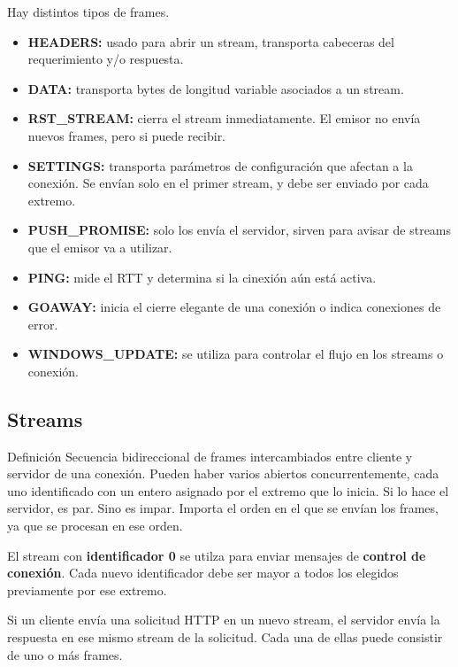 Hay distintos tipos de frames.

\begin{itemize}[label=\textcolor{acento}{$\bullet$}]
    \item \textbf{HEADERS:} usado para abrir un stream, transporta cabeceras del requerimiento y/o respuesta.
    \item \textbf{DATA:} transporta bytes de longitud variable asociados a un stream.
    \item \textbf{RST\_STREAM:} cierra el stream inmediatamente. El emisor no envía nuevos frames, pero si puede recibir.
    \item \textbf{SETTINGS:} transporta parámetros de configuración que afectan a la conexión. Se envían solo en el primer stream, y debe ser enviado por cada extremo.
    \item \textbf{PUSH\_PROMISE:} solo los envía el servidor, sirven para avisar de streams que el emisor va a utilizar.
    \item \textbf{PING:} mide el RTT y determina si la cinexión aún está activa.
    \item \textbf{GOAWAY:} inicia el cierre elegante de una conexión o indica conexiones de error.
    \item \textbf{WINDOWS\_UPDATE:} se utiliza para controlar el flujo en los streams o conexión.
\end{itemize}

\subsection{Streams}

\begin{definicion}{Definición}
    Secuencia bidireccional de frames intercambiados entre cliente y servidor de una conexión. Pueden haber varios abiertos concurrentemente, cada uno identificado con un entero asignado por el extremo que lo inicia. Si lo hace el servidor, es par. Sino es impar. Importa el orden en el que se envían los frames, ya que se procesan en ese orden.
\end{definicion}

El stream con \textbf{identificador 0} se utilza para enviar mensajes de \textbf{control de conexión}. Cada nuevo identificador debe ser mayor a todos los elegidos previamente por ese extremo.

Si un cliente envía una solicitud HTTP en un nuevo stream, el servidor envía la respuesta en ese mismo stream de la solicitud. Cada una de ellas puede consistir de uno o más frames.

